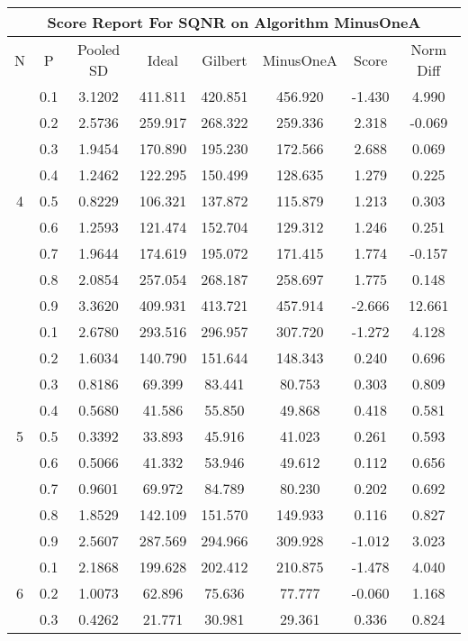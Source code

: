 \documentclass[11pt,a4paper]{report}
\begin{document}
\begin{longtable}{ | c | c || c | c | c | c | c | c | }
\hline
\multicolumn{8}{|c|}{ Score Report For SQNR on Algorithm MinusOneA} \\
\hline
N & P & Pooled SD &  Ideal &  Gilbert & MinusOneA  & Score & Norm Diff \\
 \hline
 \hline
 \endhead
\multirow{9}{*}{4} & 0.1 & 3.1202 & 411.811 & 420.851 & 456.920 & -1.430 & 4.990 \\
 & 0.2 & 2.5736 & 259.917 & 268.322 & 259.336 & 2.318 & -0.069 \\
 & 0.3 & 1.9454 & 170.890 & 195.230 & 172.566 & 2.688 & 0.069 \\
 & 0.4 & 1.2462 & 122.295 & 150.499 & 128.635 & 1.279 & 0.225 \\
 & 0.5 & 0.8229 & 106.321 & 137.872 & 115.879 & 1.213 & 0.303 \\
 & 0.6 & 1.2593 & 121.474 & 152.704 & 129.312 & 1.246 & 0.251 \\
 & 0.7 & 1.9644 & 174.619 & 195.072 & 171.415 & 1.774 & -0.157 \\
 & 0.8 & 2.0854 & 257.054 & 268.187 & 258.697 & 1.775 & 0.148 \\
 & 0.9 & 3.3620 & 409.931 & 413.721 & 457.914 & -2.666 & 12.661 \\
 \hline
\multirow{9}{*}{5} & 0.1 & 2.6780 & 293.516 & 296.957 & 307.720 & -1.272 & 4.128 \\
 & 0.2 & 1.6034 & 140.790 & 151.644 & 148.343 & 0.240 & 0.696 \\
 & 0.3 & 0.8186 & 69.399 & 83.441 & 80.753 & 0.303 & 0.809 \\
 & 0.4 & 0.5680 & 41.586 & 55.850 & 49.868 & 0.418 & 0.581 \\
 & 0.5 & 0.3392 & 33.893 & 45.916 & 41.023 & 0.261 & 0.593 \\
 & 0.6 & 0.5066 & 41.332 & 53.946 & 49.612 & 0.112 & 0.656 \\
 & 0.7 & 0.9601 & 69.972 & 84.789 & 80.230 & 0.202 & 0.692 \\
 & 0.8 & 1.8529 & 142.109 & 151.570 & 149.933 & 0.116 & 0.827 \\
 & 0.9 & 2.5607 & 287.569 & 294.966 & 309.928 & -1.012 & 3.023 \\
 \hline
\multirow{9}{*}{6} & 0.1 & 2.1868 & 199.628 & 202.412 & 210.875 & -1.478 & 4.040 \\
 & 0.2 & 1.0073 & 62.896 & 75.636 & 77.777 & -0.060 & 1.168 \\
 & 0.3 & 0.4262 & 21.771 & 30.981 & 29.361 & 0.336 & 0.824 \\

\end{longtable}
\end{document}
